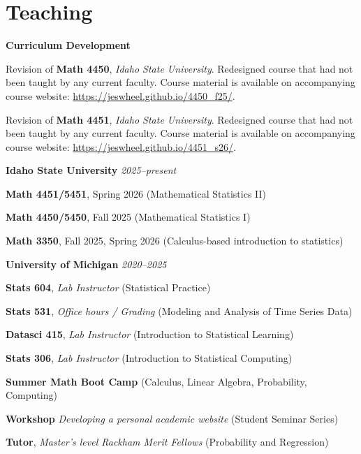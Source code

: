 \documentclass[11pt]{article}
\newenvironment {teachinglsit}
                {
                 \begin{list}{}
                 {\setlength{\labelwidth}{0mm}
                  \setlength{\leftmargin}{5mm}
                  \setlength{\labelsep}{0mm}
                  \setlength{\parsep}{0.1 ex}
                  \setlength{\itemsep}{1pt}
      \setlength{\topsep}{0.15cm}}} %
   {\end{list}}
\begin{document}
\hspace{5mm}{\it Award amount: $\$1000$}

\section*{Teaching}


\noindent \textbf{Curriculum Development} \hfill

\begin{teachinglsit}
  \item Revision of \textbf{Math 4450}, \textit{Idaho State University}. Redesigned course that had not been taught by any current faculty. Course material is available on accompanying course website: \url{https://jeswheel.github.io/4450\_f25/}.
  \item Revision of \textbf{Math 4451}, \textit{Idaho State University}. Redesigned course that had not been taught by any current faculty. Course material is available on accompanying course website: \url{https://jeswheel.github.io/4451\_s26/}.
\end{teachinglsit}

\noindent \textbf{Idaho State University} \hfill  {\textit{2025--present}}

\begin{teachinglsit}
  \item \textbf{Math 4451/5451}, Spring 2026 \hfill (Mathematical Statistics II)
  \item \textbf{Math 4450/5450}, Fall 2025 \hfill (Mathematical Statistics I)
  \item \textbf{Math 3350}, Fall 2025, Spring 2026 \hfill (Calculus-based introduction to statistics)
\end{teachinglsit}

\noindent \textbf{University of Michigan} \hfill  {\textit{2020--2025}}

\begin{teachinglsit}
    \item \textbf{Stats 604}, {\it Lab Instructor} \hfill (Statistical Practice)
    \item \textbf{Stats 531}, {\it Office hours / Grading} \hfill (Modeling and Analysis of Time Series Data)
    \item \textbf{Datasci 415}, {\it Lab Instructor} \hfill (Introduction to Statistical Learning)
    \item \textbf{Stats 306}, {\it Lab Instructor} \hfill (Introduction to Statistical Computing)
    \item \textbf{Summer Math Boot Camp} \hfill (Calculus, Linear Algebra, Probability, Computing)
    \item \textbf{Workshop} {\it Developing a personal academic website} \hfill (Student Seminar Series)
    \item \textbf{Tutor}, {\it Master's level Rackham Merit Fellows} \hfill (Probability and Regression)

\end{teachinglsit}
\end{document}
